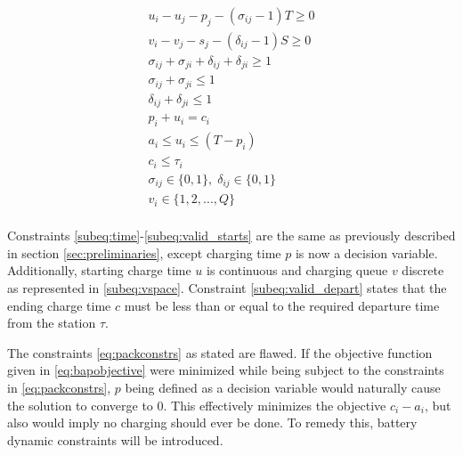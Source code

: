 \documentclass[letterpaper, 10pt, conference]{IEEEtran}
\begin{document}
\begin{subequations}
\label{eq:packconstrs}
\begin{align}
    u_i - u_j - p_j - (\sigma_{ij} - 1)T \geq 0                      \label{subeq:time}         \\
    v_i - v_j - s_j - (\delta_{ij} - 1)S \geq 0                      \label{subeq:space}        \\
    \sigma_{ij} + \sigma_{ji} + \delta_{ij} + \delta_{ji} \geq 1     \label{subeq:valid_pos}    \\
    \sigma_{ij} + \sigma_{ji} \leq 1                                 \label{subeq:sigma}        \\
    \delta_{ij} + \delta_{ji} \leq 1                                 \label{subeq:delta}        \\
    p_i + u_i = c_i                                                  \label{subeq:detach}       \\
    a_i \leq u_i \leq (T - p_i)                                      \label{subeq:valid_starts} \\
    c_i \leq \tau_i                                                  \label{subeq:valid_depart} \\
    \sigma_{ij} \in \{0,1\},\;\delta_{ij} \in \{0,1\}                \label{subeq:sdspace}      \\
    v_i \in \{1,2, ... , Q\}                                         \label{subeq:vspace}        \\
\end{align}
\end{subequations}

Constraints \eqref{subeq:time}-\eqref{subeq:valid_starts} are the same as previously described in section \ref{sec:preliminaries}, except charging time \(p\) is now a decision variable. Additionally, starting charge time \(u\) is continuous and charging queue \(v\) discrete as represented in \eqref{subeq:vspace}. Constraint \eqref{subeq:valid_depart} states that the ending charge time \(c\) must be less than or equal to the required departure time from the station \(\tau\).

The constraints \eqref{eq:packconstrs} as stated are flawed. If the objective function given in \eqref{eq:bapobjective} were minimized while being subject to the constraints in \eqref{eq:packconstrs}, \(p\) being defined as a decision variable would naturally cause the solution to converge to 0. This effectively minimizes the objective \(c_i - a_i\), but also would imply no charging should ever be done. To remedy this, battery dynamic constraints will be introduced.
\end{document}
